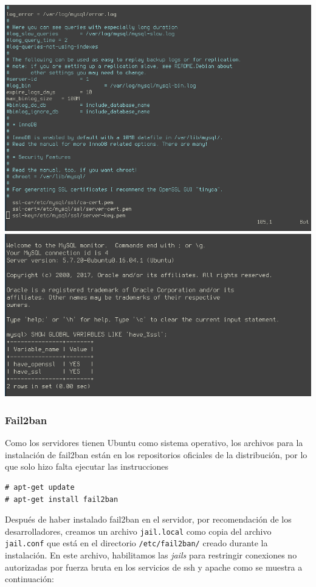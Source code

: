 \documentclass[9pt]{article}
\begin{document}
\includegraphics[width=\textwidth]{mysql_conf-ssl}
\includegraphics[width=\textwidth]{mysql_ssl-enabled}

\subsubsection*{Fail2ban}
Como los servidores tienen \textsf{Ubuntu} como sistema operativo, los archivos para la instalación de \textsf{fail2ban} están en los repositorios oficiales de la distribución, por lo que solo hizo falta ejecutar las instrucciones
\begin{verbatim}
# apt-get update
# apt-get install fail2ban
\end{verbatim}
Después de haber instalado \textsf{fail2ban} en el servidor, por recomendación de los desarrolladores, creamos un archivo \texttt{jail.local} como copia del archivo \texttt{jail.conf} que está en el directorio \texttt{/etc/fail2ban/} creado durante la instalación. En este archivo, habilitamos las \textit{jails} para restringir conexiones no autorizadas por fuerza bruta en los servicios de \textsf{ssh} y \textsf{apache} como se muestra a continuación:
\end{document}
